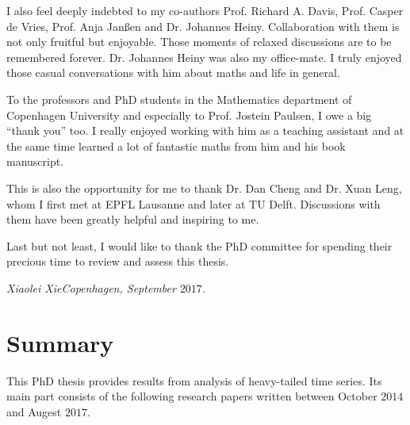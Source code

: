 I also feel deeply indebted to my co-authors Prof. Richard A. Davis,
Prof. Casper de Vries, Prof. Anja Jan\ss en and Dr. Johannes Heiny.
Collaboration with them is not only fruitful but enjoyable. Those moments
of relaxed discussions are to be remembered forever. Dr. Johannes Heiny
was also my office-mate. I truly enjoyed those casual conversations
with him about maths and life in general.

To the professors and PhD students in the Mathematics department of
Copenhagen University and especially to Prof. Jostein Paulsen, I owe a
big ``thank you'' too. I really enjoyed working with him as a teaching
assistant and at the same time learned a lot of fantastic maths from him
and his book manuscript.

This is also the opportunity for me to thank Dr. Dan Cheng and
Dr. Xuan Leng, whom I first met at EPFL Lausanne and later at TU Delft.
Discussions with them have been greatly helpful and inspiring to me.

Last but not least, I would like to thank the PhD committee for spending
their precious time to review and assess this thesis.
\bigskip


{\em Xiaolei Xie\qquad \qquad \qquad \qquad \qquad Copenhagen, September $2017$.}


\chapter*{Summary}
This PhD thesis provides results from analysis of heavy-tailed time
series. Its main part consists of the following research papers
written between October $2014$ and Augest $2017$.

